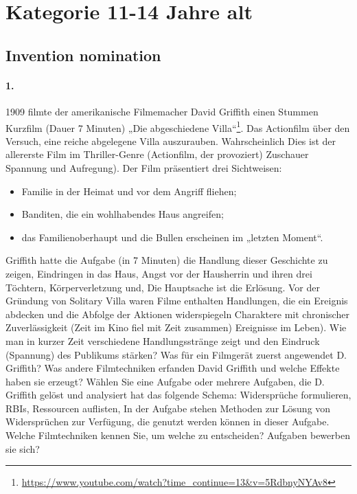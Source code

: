 \documentclass[11pt,a4paper]{article}
\begin{document}
\clearpage
\section*{Kategorie 11-14 Jahre alt}

\subsection*{Invention nomination}

\paragraph{1.}
1909 filmte der amerikanische Filmemacher David Griffith einen Stummen
Kurzfilm (Dauer 7 Minuten) „Die abgeschiedene
Villa“\footnote{\url{https://www.youtube.com/watch?time_continue=13&v=5RdbnyNYAv8}}.
Das Actionfilm über den Versuch, eine reiche abgelegene Villa auszurauben.
Wahrscheinlich Dies ist der allererste Film im Thriller-Genre (Actionfilm, der
provoziert) Zuschauer Spannung und Aufregung). Der Film präsentiert drei
Sichtweisen:
\begin{itemize}
  \item Familie in der Heimat und vor dem Angriff fliehen;
  \item Banditen, die ein wohlhabendes Haus angreifen;
  \item das Familienoberhaupt und die Bullen erscheinen im „letzten Moment“.
\end{itemize}
Griffith hatte die Aufgabe (in 7 Minuten) die Handlung dieser Geschichte zu
zeigen, Eindringen in das Haus, Angst vor der Hausherrin und ihren drei
Töchtern, Körperverletzung und, Die Hauptsache ist die Erlösung. Vor der
Gründung von Solitary Villa waren Filme enthalten Handlungen, die ein Ereignis
abdecken und die Abfolge der Aktionen widerspiegeln Charaktere mit chronischer
Zuverlässigkeit (Zeit im Kino fiel mit Zeit zusammen) Ereignisse im
Leben). Wie man in kurzer Zeit verschiedene Handlungsstränge zeigt und den
Eindruck (Spannung) des Publikums stärken? Was für ein Filmgerät zuerst
angewendet D. Griffith? Was andere Filmtechniken erfanden David Griffith und
welche Effekte haben sie erzeugt? Wählen Sie eine Aufgabe oder mehrere
Aufgaben, die D. Griffith gelöst und analysiert hat das folgende Schema:
Widersprüche formulieren, RBIs, Ressourcen auflisten, In der Aufgabe stehen
Methoden zur Lösung von Widersprüchen zur Verfügung, die genutzt werden können
in dieser Aufgabe. Welche Filmtechniken kennen Sie, um welche zu entscheiden?
Aufgaben bewerben sie sich?
\end{document}
